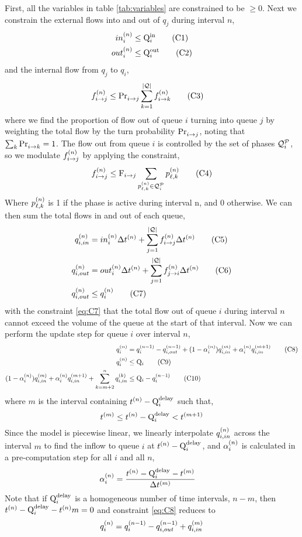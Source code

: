 First, all the variables in table \ref{tab:variables} are constrained to be $\ge 0$.
Next we constrain the external flows into and out of $q_j$ during interval $n$,
\begin{align}
\inq{i} &\le \QIN{i} \tag{C1}\label{eq:C1}\\        
\outq{i} &\le \QOUT{i} \tag{C2}\label{eq:C2}
\end{align}
and the internal flow from $q_j$ to $q_i$,
\begin{align}
\f{i}{j} &\le \FTURN{i}{j} \sum \limits_{k=1}^{\Qn}  \f{i}{k} \tag{C3}\label{eq:C3}
\end{align}
where we find the proportion of flow out of queue $i$ turning into queue $j$ by weighting the total flow by the turn probability $\FTURN{i}{j}$, noting that $\sum_k \FTURN{i}{k}=1$. The flow out from queue $i$ is controlled by the set of phases $\QPset{i}$, so we modulate $\f{i}{j}$ by applying the constraint,
\begin{align}
\f{i}{j} \le \FMAX{i}{j} \sum \limits_{\p{\ell}{k} \in \QPset{i}} {\p{\ell}{k}} \tag{C4}\label{eq:C4}
\end{align}
Where $\p{\ell}{k}$ is 1 if the phase is active during interval n, and 0 otherwise. We can then sum the total flows in and out of each queue,
\begin{align}
\qin{i} &= \inq{i} \DT + \sum \limits_{j=1}^{\Qn}  \f{i}{j} \DT   \tag{C5}\label{eq:C5} \\
\qout{i} &= \outq{i} \DT + \sum \limits_{j=1}^{\Qn}  \f{j}{i} \DT \tag{C6}\label{eq:C6}\\
\qout{i} &\le \q{i} \tag{C7}\label{eq:C7}
\end{align}
with the constraint \ref{eq:C7} that the total flow out of queue $i$ during interval $n$ cannot exceed the volume of the queue at the start of that interval.
Now we can perform the update step for queue $i$ over interval $n$,
\begin{align}
\q{i} &= \q[n-1]{i} - \qout[n-1]{i} + (1-\aph{i})\qin[m]{i} + \aph{i} \qin[m+1]{i} \tag{C8}\label{eq:C8}\\
\q{i} &\le \QMAX{i} \tag{C9}\label{eq:C9}\\
(1-\aph{i})\qin[m]{i} + \aph{i} \qin[m+1]{i} + \sum \limits_{k=m+2}^n \qin[k]{i} &\le \QMAX{i} - \q[n-1]{i}\tag{C10}\label{eq:C10}
\end{align}
where $m$ is the interval containing $\tn - \QDELAY{i}$ such that, 
\begin{equation}
\tn[m] \le \tn-\QDELAY{i} < \tn[m+1]
\end{equation}
Since the model is piecewise linear, we linearly interpolate $\qin{i}$ across the interval $m$ to find the inflow to queue $i$ at $\tn - \QDELAY{i}$, and $\aph{i}$ is calculated in a pre-computation step for all $i$ and all $n$,
\begin{align}
\aph{i} &= \frac{\tn - \QDELAY{i} - \tn[m]}{\DT[m]}
\end{align}
Note that if $\QDELAY{i}$ is a homogeneous number of time intervals, $n-m$, then $\tn - \QDELAY{i} - \tn{m}=0$ and constraint \ref{eq:C8} reduces to
\begin{equation}
\q{i} = \q[n-1]{i} - \qout[n-1]{i} + \qin[m]{i}
\end{equation}

